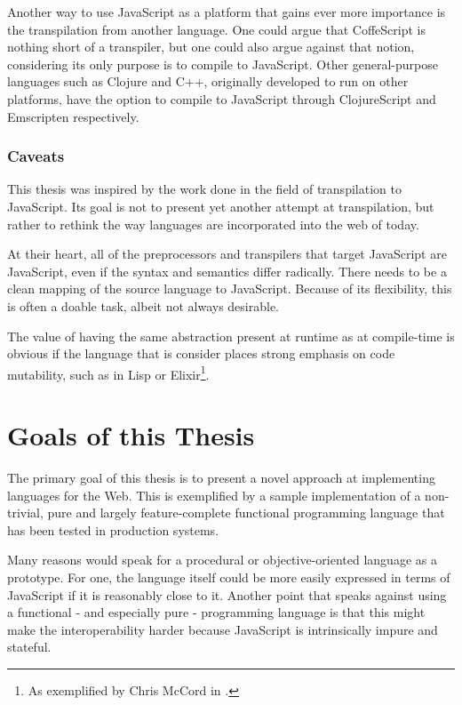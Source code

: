 \documentclass[oneside,11pt,xetex]{scrbook}
\begin{document}
Another way to use JavaScript as a platform that gains ever more importance
is the transpilation from another language. One could argue that CoffeScript
is nothing short of a transpiler, but one could also argue against that notion,
considering its only purpose is to compile to JavaScript. Other general-purpose
languages such as Clojure and C++, originally developed to run on other platforms,
have the option to compile to JavaScript through ClojureScript\parencite{CLJS} and
Emscripten\parencite{ZAKA} respectively.

\subsubsection{Caveats}

This thesis was inspired by the work done in the field of transpilation to
JavaScript. Its goal is not to present yet another attempt at transpilation,
but rather to rethink the way languages are incorporated into the web of today.

At their heart, all of the preprocessors and transpilers that target JavaScript
are JavaScript, even if the syntax and semantics differ radically. There needs
to be a clean mapping of the source language to JavaScript. Because of its flexibility,
this is often a doable task, albeit not always desirable.

The value of having the same abstraction present at runtime as at compile-time
is obvious if the language that is consider places strong emphasis on code
mutability, such as in Lisp or Elixir\footnote{As exemplified by Chris McCord in
\parencite{ELIX}.}.

\section{Goals of this Thesis}

The primary goal of this thesis is to present a novel approach at implementing languages
for the Web. This is exemplified by a sample implementation of a non-trivial, pure and
largely feature-complete functional programming language that has been tested
in production systems.

Many reasons would speak for a procedural or objective-oriented language as
a prototype. For one, the language itself could be more easily expressed in
terms of JavaScript if it is reasonably close to it. Another point that speaks
against using a functional - and especially pure - programming language is that
this might make the interoperability harder because JavaScript is intrinsically
impure and stateful.
\end{document}
